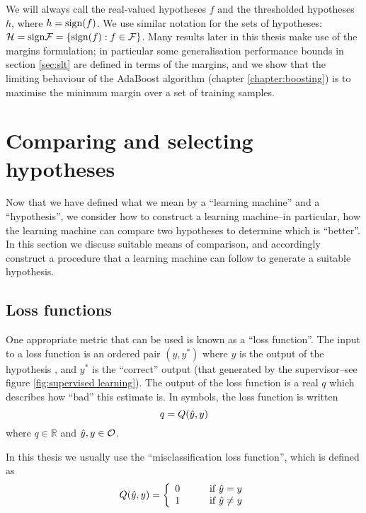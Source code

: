 We will always call the real-valued hypotheses $f$ and the
thresholded hypotheses $h$, where $h = \mathrm{sign}(f)$.  We use similar
notation for the sets of hypotheses: $\mathcal{H} = \mathrm{sign} \mathcal{F} = \{
 \mathrm{sign}(f) : f \in \mathcal{F} \}$.  Many results later in this thesis make
use of the margins formulation; in particular some generalisation
performance bounds in section \ref{sec:slt} are defined in terms of
the margins, and we show that the limiting behaviour of the AdaBoost
algorithm (chapter \ref{chapter:boosting}) is to maximise the minimum
margin over a set of training samples.

\section{Comparing and selecting hypotheses}
\label{sec:comparing and selecting}

Now that we have defined what we mean by a ``learning machine'' and a
``hypothesis'', we consider how to construct a learning machine--in
particular, how the learning machine can compare two hypotheses to
determine which is ``better''.  In this section we discuss suitable
means of comparison, and accordingly construct a procedure that a
learning machine can follow to generate a suitable hypothesis.

\subsection{Loss functions}
\label{sec:loss function}

One appropriate metric that can be used is known as a ``loss
function''.  The input to a loss function is an ordered pair
$(y, y^{\ast})$ where $y$ is the output of the hypothesis , and
$y^{\ast}$ is the ``correct'' output (that generated by the
supervisor--see figure \ref{fig:supervised learning}).  The output of
the loss function is a real $q$ which describes how ``bad'' this
estimate is.  In symbols, the loss function is written
%
\begin{equation}
q = Q(\hat{y}, y)
\end{equation}
%
where $q \in \mathbb{R}$ and $\hat{y}, y \in \mathcal{O}$.

In this thesis we usually use the ``misclassification loss function'',
which is defined as 
%
\begin{equation}
Q(\hat{y}, y) = \left\{
\begin{array}{ll}
	0	&	\qquad \mbox{if $\hat{y} = y$} \\
	1	&	\qquad \mbox{if $\hat{y} \neq y$}
\end{array}
\right.
\label{eqn:misclassification loss function}
\end{equation}


